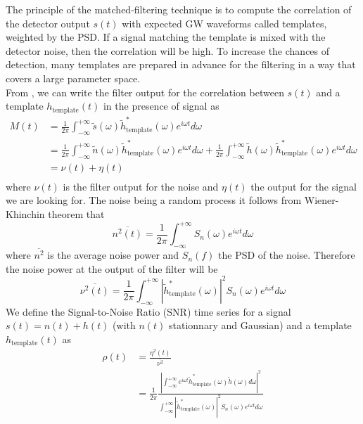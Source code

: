The principle of the matched-filtering technique is to compute the correlation of the detector output $s(t)$ with expected GW  waveforms called templates, weighted by the PSD.
If a signal matching the template is mixed with the detector noise, then the correlation will be high.
To increase the chances of detection, many templates are prepared in advance for the filtering in a way that covers a large parameter space.\\
From \cite{extract_signal}, we can write the filter output for the correlation between $s(t)$ and a template $h_{\textrm{template}}(t)$ in the presence of signal as
%
\begin{align}
  M(t) &=\frac{1}{2\pi} \int_{-\infty}^{+\infty} \tilde{s}(\omega)\tilde{h}_{\textrm{template}}^*(\omega) e^{i\omega t} d\omega\\
  &= \frac{1}{2\pi} \int_{-\infty}^{+\infty} \tilde{n}(\omega)\tilde{h}_{\textrm{template}}^*(\omega) e^{i\omega t} d\omega + \frac{1}{2\pi} \int_{-\infty}^{+\infty} \tilde{h}(\omega)\tilde{h}_{\textrm{template}}^*(\omega) e^{i\omega t} d\omega\\
  &= \nu(t) + \eta(t)\\
\end{align}
%
where $\nu(t)$ is the filter output for the noise and $\eta(t)$ the output for the signal we are looking for.
The noise being a random process it follows from Wiener-Khinchin theorem \cite{extract_signal} that
%
\begin{equation}
  \overline{n^2(t)} = \frac{1}{2\pi} \int_{-\infty}^{+\infty} S_n(\omega) e^{i\omega t}d\omega
\end{equation}
%
where $\overline{n^2}$ is the average noise power and $S_n(f)$ the PSD of the noise.
Therefore the noise power at the output of the filter will be
%
\begin{equation}
  \overline{\nu^2(t)} = \frac{1}{2\pi} \int_{-\infty}^{+\infty} \left| \tilde{h}_{\textrm{template}}^*(\omega) \right|^2 S_n(\omega)e^{i\omega t}d\omega
\end{equation}
%
We define the Signal-to-Noise Ratio (SNR) time series for a signal $s(t) = n(t) + h(t)$ (with $n(t)$ stationnary and Gaussian) and a template $h_{\textrm{template}}(t)$ as
%
\begin{align}
  \rho(t) &= \frac{\eta^2(t)}{\overline{\nu^2}}\\
  & = \frac{1}{2\pi} \frac{ \left| \int_{-\infty}^{+\infty} e^{i\omega t} \tilde h_{\textrm{template}}^*(\omega) \tilde{h}(\omega) d\omega \right|^2 }{ \int_{-\infty}^{+\infty} \left| \tilde{h}_{\textrm{template}}^*(\omega) \right|^2  S_n(\omega) e^{i\omega t} d\omega }
\end{align}
